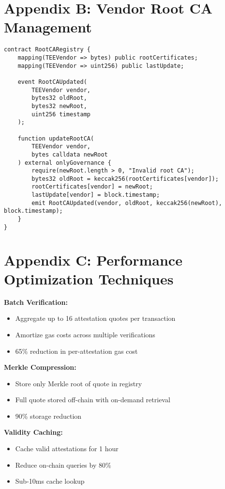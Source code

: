 \documentclass[11pt,a4paper]{article}
\begin{document}
\section{Appendix B: Vendor Root CA Management}

\begin{lstlisting}[language=Solidity, basicstyle=\footnotesize\ttfamily]
contract RootCARegistry {
    mapping(TEEVendor => bytes) public rootCertificates;
    mapping(TEEVendor => uint256) public lastUpdate;
    
    event RootCAUpdated(
        TEEVendor vendor,
        bytes32 oldRoot,
        bytes32 newRoot,
        uint256 timestamp
    );
    
    function updateRootCA(
        TEEVendor vendor,
        bytes calldata newRoot
    ) external onlyGovernance {
        require(newRoot.length > 0, "Invalid root CA");
        bytes32 oldRoot = keccak256(rootCertificates[vendor]);
        rootCertificates[vendor] = newRoot;
        lastUpdate[vendor] = block.timestamp;
        emit RootCAUpdated(vendor, oldRoot, keccak256(newRoot), block.timestamp);
    }
}
\end{lstlisting}

\section{Appendix C: Performance Optimization Techniques}

\textbf{Batch Verification:}
\begin{itemize}
\item Aggregate up to 16 attestation quotes per transaction
\item Amortize gas costs across multiple verifications
\item 65\% reduction in per-attestation gas cost
\end{itemize}

\textbf{Merkle Compression:}
\begin{itemize}
\item Store only Merkle root of quote in registry
\item Full quote stored off-chain with on-demand retrieval
\item 90\% storage reduction
\end{itemize}

\textbf{Validity Caching:}
\begin{itemize}
\item Cache valid attestations for 1 hour
\item Reduce on-chain queries by 80\%
\item Sub-10ms cache lookup
\end{itemize}
\end{document}
